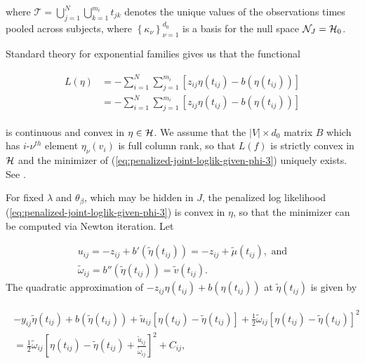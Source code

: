 \noindent
where $\mathcal{T} = \bigcup_{j=1}^N\bigcup_{k=1}^{m_i} t_{jk}$ denotes the unique values of the observations times pooled across subjects, where $\left\{\kappa_\nu \right\}_{\nu=1}^{d_0}$ is a basis for the null space $\mathcal{N}_J = \mathcal{H}_0$. 

\bigskip

Standard theory for exponential families gives us that the functional 

\begin{align}
\begin{split}
L\left( \eta \right) &= -\sum_{i=1}^N \sum_{j=1}^{m_i} \left[ z_{ij} \eta\left(t_{ij}\right) - b\left(\eta\left(t_{ij}\right)\right) \right] \\
&= -\sum_{i=1}^N \sum_{j=1}^{m_i} \left[ z_{ij} \eta\left(t_{ij}\right) - b\left(\eta\left(t_{ij}\right)\right) \right]
\end{split} \label{eq:penalized-likelihood-functional}
\end{align}

\noindent
is continuous and convex in $\eta \in \mathcal{H}$. We assume that the $\vert V \vert \times d_0$ matrix $B$ which has $i$-$\nu^{th}$ element $\eta_\nu\left(v_i\right)$ is full column rank, so that $L\left(f\right)$ is strictly convex in $\mathcal{H}$ and the minimizer of (\ref{eq:penalized-joint-loglik-given-phi-3}) uniquely exists. See \cite{wahba1995smoothing}. 

\bigskip

For fixed $\lambda$ and $\theta_\beta$, which may be hidden in $J$, the penalized log likelihood (\ref{eq:penalized-joint-loglik-given-phi-3}) is convex in $\eta$, so that the minimizer can be computed via Newton iteration. Let 

\begin{align*}
u_{ij} = -z_{ij} + b'\left( \tilde{\eta}\left(t_{ij}\right) \right) =  -z_{ij} +  \tilde{\mu}\left(t_{ij}\right), \mbox{ and}\\
\tilde{\omega}_{ij} = b''\left( \tilde{\eta}\left(t_{ij}\right) \right) = \tilde{v}\left(t_{ij}\right).
\end{align*}
The quadratic approximation of $-z_{ij} \eta\left(t_{ij}\right) + b\left(\eta\left(t_{ij}\right)\right)$ at $\tilde{\eta}\left(t_{ij}\right)$ is given by 

\begin{align*}
\begin{split}
-y_{ij}\tilde{\eta}\left(t_{ij}\right) + b\left(\tilde{\eta}\left(t_{ij}\right)\right) + \tilde{u}_{ij} \left[  \eta\left(t_{ij}\right) - \tilde{\eta}\left(t_{ij}\right)  \right] + \frac{1}{2} \tilde{\omega}_{ij} \left[ \eta\left(t_{ij}\right) - \tilde{\eta}\left(t_{ij}\right)  \right]^2 \\
 =  \frac{1}{2} \tilde{\omega}_{ij} \left[ \eta\left(t_{ij}\right) - \tilde{\eta}\left(t_{ij}\right) + \frac{\tilde{u}_{ij}}{\tilde{\omega}_{ij}} \right]^2 + C_{ij},
 \end{split}
\end{align*}


